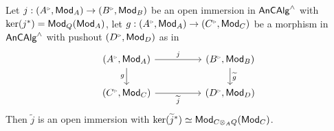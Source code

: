 \begin{proposition}\label{prop: pushouts along open immersions}
    Let $j:(A^{\tri},\Mod_{A})\to(B^{\tri},\Mod_{B})$ be an open immersion in $\mathsf{An}\mathsf{CAlg}^{\wedge}$ with $\ker(j^{*})=\mathsf{Mod}_{Q}(\mathsf{Mod}_{A})$, let $g:(A^{\tri},\Mod_{A})\to(C^{\tri},\Mod_{C})$ be a morphism in $\mathsf{An}\mathsf{CAlg}^{\wedge}$ with pushout $(D^{\tri},\Mod_{D})$ as in 
    $$%
    \begin{tikzcd}
        {(A^{\tri},\Mod_{A})} && {(B^{\tri},\Mod_{B})} \\
        {(C^{\tri},\Mod_{C})} && {(D^{\tri},\Mod_{D})}
        \arrow["j", from=1-1, to=1-3]
        \arrow["g"', from=1-1, to=2-1]
        \arrow["{\widetilde{g}}", from=1-3, to=2-3]
        \arrow["{\widetilde{j}}"', from=2-1, to=2-3]
    \end{tikzcd}$$
    Then $\widetilde{j}$ is an open immersion with $\ker(\widetilde{j}^{*})\simeq\mathsf{Mod}_{C\otimes_{A}Q}(\mathsf{Mod}_{C})$. 
\end{proposition}
